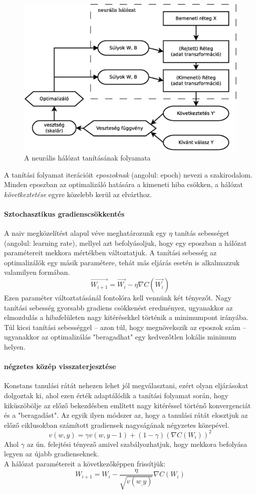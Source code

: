 \begin{figure}[h]
	\centering
	\includegraphics[width=0.7\linewidth]{fig/DNN_dia}
	\caption{A neurális hálózat tanításának folyamata}
	\label{fig:dnn}
\end{figure}

A tanítási folyamat iterációit \emph{eposzoknak} (angolul: epoch) nevezi a szakirodalom. Minden eposzban az optimalizáló hatására a kimeneti hiba csökken, a hálózat \emph{következtetése} egyre közelebb kerül az elvárthoz. 

\paragraph[SGD]{Sztochasztikus gradienscsökkentés}
A naiv megközelítést alapul véve meghatározunk egy $\eta$ tanítás sebességet (angolul: learning rate), mellyel azt befolyásoljuk, hogy egy eposzban a hálózat paramétereit mekkora mértékben változtatjuk. A tanítási sebesség az optimalizálók egy másik paramétere, tehát más eljárás esetén is alkalmazzuk valamilyen formában.
\begin{displaymath}
\vec{W_{i+1}} = \vec{W_i} - \eta\nabla C(\vec{W_i})
\end{displaymath}
Ezen paraméter változtatásánál fontolóra kell vennünk két tényezőt. Nagy tanítási sebesség gyorsabb gradiens csökkenést eredményez, ugyanakkor az elmozdulás a hibafelületen nagy kitérésekkel történik a minimumpont irányába. Túl kicsi tanítási sebességgel -- azon túl, hogy megnövekszik az eposzok szám --  ugyanakkor az optimalizálás "beragadhat" egy kedvezőtlen lokális minimum helyen.

\paragraph[RMSprop]{négzetes közép visszaterjesztése}
Konstans tanulási rátát nehezen lehet jól megválasztani, ezért olyan eljárásokat dolgoztak ki, ahol ezen érték adaptálódik a tanítási folyamat során, hogy kiküszöbölje az előző bekezdésben említett nagy kitéréssel történő konvergenciát és a "beragadást". Az egyik ilyen módszer az, hogy a tanulási rátát elosztjuk az előző ciklusokban számított gradiensek nagyságának négyzetes közepével.
$$ v(w,y) = \gamma v(w,y-1) +(1-\gamma)(\nabla C(W_i))^2 $$
Ahol $\gamma$ az ún. felejtési tényező amivel szabályozhatjuk, hogy mekkora befolyása legyen az újabb gradienseknek.\\
A hálózat paramétereit a következőképpen frissítjük:
$$ W_{i+1} = W_i - \frac{\eta}{\sqrt{v(w_,y)}} \nabla C(W_i) $$

